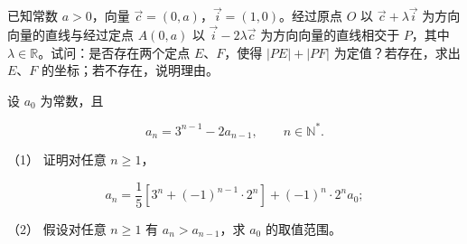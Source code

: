 \begin{question}
已知常数 $a>0$，向量 $\vec c=(0,a)$，$\vec i=(1,0)$。经过原点 $O$ 以 $\vec c+\lambda\vec i$ 为方向向量的直线与经过定点 $A(0,a)$ 以 $\vec i-2\lambda\vec c$ 为方向向量的直线相交于 $P$，其中 $\lambda\in\mathbb R$。试问：是否存在两个定点 $E\text{、}F$，使得 $|PE|+|PF|$ 为定值？若存在，求出 $E\text{、}F$ 的坐标；若不存在，说明理由。

\end{question}
\begin{question}
设 $a_0$ 为常数，且

\nopagebreak[4]
\[
a_n=3^{n-1}-2a_{n-1},\qquad n\in\mathbb N^*.
\]

（1） 证明对任意 $n\geqslant1$，

\nopagebreak[4]
\[
a_n=\frac15\left[3^n+(-1)^{n-1}\cdot2^n\right]+(-1)^n\cdot2^n a_0;
\]

（2） 假设对任意 $n\geqslant1$ 有 $a_n>a_{n-1}$，求 $a_0$ 的取值范围。

\end{question}